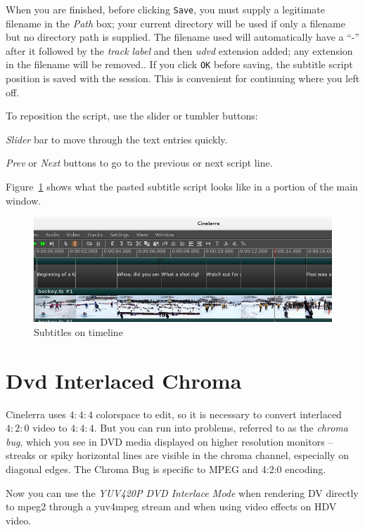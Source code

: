 When you are finished, before clicking \texttt{Save}, you must supply a legitimate filename in the \textit{Path} box; your current directory will be used if only a filename but no directory path is supplied.  The filename used will automatically have a “-” after it followed by the \textit{track label} and then \textit{udvd} extension added; any extension in the filename will be removed..  If you click \texttt{OK} before saving, the subtitle script position is saved with the session.  This is convenient for continuing where you left off.

\noindent To reposition the script, use the slider or tumbler buttons:

\textit{Slider} bar to move through the text entries quickly.

\textit{Prev} or \textit{Next} buttons to go to the previous or next script line.

\noindent Figure~\ref{fig:subtitle02} shows what the pasted subtitle script looks like in a portion of the main window.

\begin{figure}[htpb]
    \centering
    \includegraphics[width=0.9\linewidth]{images/subtitle02.png}
    \caption{Subtitles on timeline}
    \label{fig:subtitle02}
\end{figure}

\section{Dvd Interlaced Chroma}%
\label{sec:dvd_interlaced_chroma}

Cinelerra uses $4:4:4$ colorspace to edit, so it is necessary to convert interlaced $4:2:0$ video to $4:4:4$.
But you can run into problems, referred to as the \textit{chroma bug}, which you see in DVD media displayed on higher resolution monitors -- streaks or spiky horizontal lines are visible in the chroma channel, especially on diagonal edges. The Chroma Bug is specific to MPEG and 4:2:0 encoding.

Now you can use the \textit{YUV420P DVD Interlace Mode} when rendering DV directly to mpeg2 through a yuv4mpeg stream and when using video effects on HDV video.

